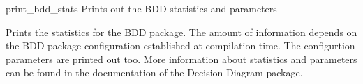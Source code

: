 \begin{nusmvCommand} {print\_bdd\_stats} {Prints out the BDD statistics and parameters}


Prints the statistics for the BDD package. The amount of information
depends on the BDD package configuration established at compilation
time. The configurtion parameters are printed out too. More
information about statistics and parameters can be found in the
documentation of the \cudd Decision Diagram package.

\end{nusmvCommand}
